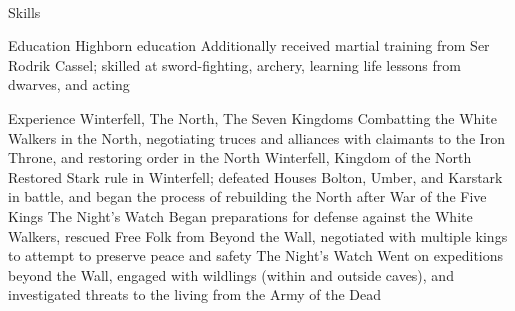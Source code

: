 \documentclass[]{resume-knyte}
\begin{document}



\begin{subheader}{1}
    \\
\end{subheader}

\begin{topic}{Skills}
    \\ %
\end{topic}

\begin{topic}{Education}
    {Highborn education}
    {Additionally received martial training from Ser Rodrik Cassel; skilled
    at sword-fighting, archery, learning life lessons from dwarves, and acting}
\end{topic}

\begin{topic}{Experience}
    {Winterfell, The North, The Seven Kingdoms}
    {Combatting the White Walkers in the North, negotiating truces and
    alliances with claimants to the Iron Throne, and restoring order in the
    North}
    {Winterfell, Kingdom of the North}
    {Restored Stark rule in Winterfell; defeated Houses Bolton, Umber, and
    Karstark in battle, and began the process of rebuilding the North after
    War of the Five Kings}
    {The Night's Watch}
    {Began preparations for defense against the White Walkers, rescued
    Free Folk from Beyond the Wall, negotiated with multiple kings to
    attempt to preserve peace and safety}
    {The Night's Watch}
    {Went on expeditions beyond the Wall, engaged with wildlings (within
    and outside caves), and investigated threats to the living from the Army
    of the Dead}
\end{topic}
\end{document}
